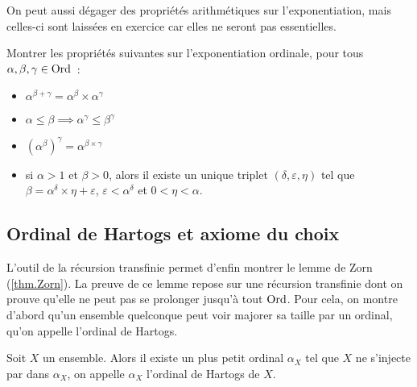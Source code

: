 On peut aussi dégager des propriétés arithmétiques sur l'exponentiation, mais
celles-ci sont laissées en exercice car elles ne seront pas essentielles.

\begin{exercise}
  Montrer les propriétés suivantes sur l'exponentiation ordinale, pour tous
  $\alpha,\beta,\gamma\in\operatorname{Ord}$~:
  \begin{itemize}
  \item $\alpha^{\beta+\gamma} = \alpha^\beta\times\alpha^\gamma$
  \item $\alpha \leq \beta \implies \alpha^\gamma\leq\beta^\gamma$
  \item $(\alpha^\beta)^\gamma = \alpha^{\beta\times\gamma}$
  \item si $\alpha > 1$ et $\beta >0$, alors il existe un unique triplet
    $(\delta,\varepsilon,\eta)$ tel que
    $\beta = \alpha^\delta\times\eta + \varepsilon$, $\varepsilon < \alpha^\delta$
    et $0 < \eta < \alpha$.
  \end{itemize}
\end{exercise}

\subsection{Ordinal de Hartogs et axiome du choix}\label{sbsct.Zorn}

L'outil de la récursion transfinie permet d'enfin montrer le lemme de Zorn
(\cref{thm.Zorn}). La preuve de ce lemme repose sur une récursion transfinie
dont on prouve qu'elle ne peut pas se prolonger jusqu'à tout $\operatorname{Ord}$. Pour cela,
on montre d'abord qu'un ensemble quelconque peut voir majorer sa taille par un
ordinal, qu'on appelle l'ordinal de Hartogs.

\begin{definition}
  Soit $X$ un ensemble. Alors il existe un plus petit ordinal $\alpha_X$ tel
  que $X$ ne s'injecte par dans $\alpha_X$, on appelle $\alpha_X$ l'ordinal
  de Hartogs de $X$.
\end{definition}

